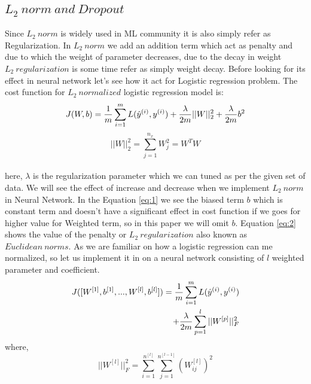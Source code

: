 \documentclass{article}
\begin{document}
\begin{multicols}{2}
\section{$L_2 \ norm \  and\  Dropout$}
Since $L_2 \ norm$ is widely used in ML community it is also simply refer as Regularization. In $L_2 \ norm$ we add an addition term which act as penalty and due to which the weight of parameter decreases, due to the decay in weight $L_2 \ regularization$ is some time refer as simply weight decay.\cite{martin2018implicit} Before looking for its effect in neural network let's see how it act for Logistic regression problem. The cost function for $L_2 \ normalized$ logistic regression model is: \\

\begin{equation}
\label{eq:1}
J(W,b) = {1 \over m} \sum _{i=1}^m L(\hat y^{(i)},y^{(i)}) + {\lambda \over 2m} ||W||_2^2 + {\lambda \over 2m} b^2
\end{equation}
\begin{equation}
\label{eq:2}
    ||W||_2^2 = \sum_{j=1}^{n_x} W_j^2 = W^TW
\end{equation}
\\
here, $\lambda$ is the regularization parameter which we can tuned as per the given set of data. We will see the effect of increase and decrease when we implement $L_2 \ norm$ in Neural Network. In the Equation \ref{eq:1} we see the biased term $b$ which is constant term and doesn't have a significant effect in cost function if we goes for higher value for Weighted term, so in this paper we will omit $b$. Equation \ref{eq:2} shows the value of the penalty or $L_2 \ regularization$ also known as $Euclidean \ norms$. As we are familiar on how a logistic regression can me normalized, so let us implement it in on a neural network consisting of $l$ weighted parameter and coefficient.
\begin{equation}
\label{eq:3}
\begin{aligned}
    J([W^{[1]},b^{[1]},...,W^{[l]},b^{[l]}]) = 
    {1 \over m} \sum _{i=1}^m L(\hat y^{(i)},y^{(i)})\\+{\lambda \over 2m} \sum_{p=1}^{l}||W^{[p]}||_F^2
    \end{aligned}
\end{equation}
where, \\
\begin{equation}
\label{eq:4}
    || W^{[l]}||^2_F = \sum_{i=1}^{n^{[l]}} \sum_{j=1}^{n^{[l-1]}} (W_{ij}^{[l]})^2
\end{equation}

\end{multicols}
\end{document}
